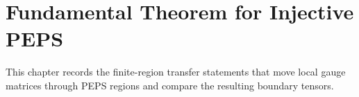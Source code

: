
\chapter{Fundamental Theorem for Injective PEPS}%
\label{ch:peps_ft}
\label{sec:peps_ft}

This chapter records the finite-region transfer statements that move local
gauge matrices through PEPS regions and compare the resulting boundary tensors.


